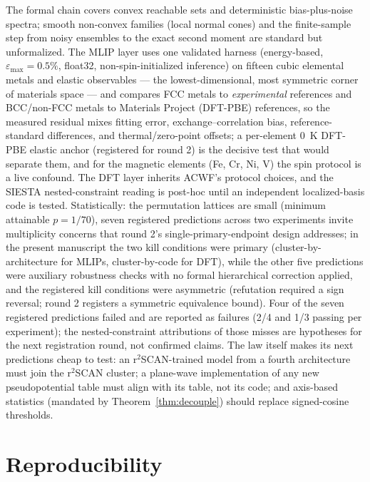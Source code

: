 \documentclass[11pt]{article}
\begin{document}
The formal chain covers convex reachable sets and deterministic
bias-plus-noise spectra; smooth non-convex families (local normal cones) and
the finite-sample step from noisy ensembles to the exact second moment are
standard but unformalized. The MLIP layer uses one validated harness
(energy-based, $\varepsilon_{\max}=0.5\%$, float32, non-spin-initialized
inference) on fifteen cubic elemental metals and elastic observables --- the
lowest-dimensional, most symmetric corner of materials space --- and compares
FCC metals to \emph{experimental} references and BCC/non-FCC metals to
Materials Project (DFT-PBE) references, so the measured residual mixes fitting
error, exchange--correlation bias, reference-standard differences, and
thermal/zero-point offsets; a
per-element 0~K DFT-PBE elastic anchor (registered for round 2) is the
decisive test that would separate them, and for the magnetic elements (Fe,
Cr, Ni, V) the spin protocol is a live confound. The DFT layer inherits
ACWF's protocol choices, and the SIESTA nested-constraint reading is
post-hoc until an independent localized-basis code is tested. Statistically:
the permutation lattices are small (minimum attainable $p = 1/70$), seven
registered predictions across two experiments invite multiplicity concerns
that round 2's single-primary-endpoint design addresses; in the present
manuscript the two kill conditions were primary (cluster-by-architecture for
MLIPs, cluster-by-code for DFT), while the other five predictions were
auxiliary robustness checks with no formal hierarchical correction applied, and the registered
kill conditions were asymmetric (refutation required a sign reversal;
round 2 registers a symmetric equivalence bound). Four of the seven
registered predictions failed and are reported as failures (2/4 and 1/3
passing per experiment); the nested-constraint attributions of those misses
are hypotheses for the next registration round, not confirmed claims. The law
itself makes its next predictions cheap to test: an r$^2$SCAN-trained model
from a fourth architecture must join the r$^2$SCAN cluster; a plane-wave
implementation of any new pseudopotential table must align with its table,
not its code; and axis-based statistics (mandated by
Theorem~\ref{thm:decouple}) should replace signed-cosine thresholds.

\section{Reproducibility}
\label{sec:repro}
\end{document}
